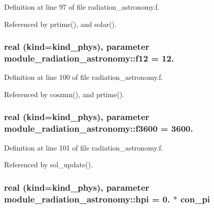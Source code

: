 Definition at line 97 of file radiation\+\_\+astronomy.\+f.



Referenced by prtime(), and solar().

\subsubsection[{\texorpdfstring{f12}{f12}}]{\setlength{\rightskip}{0pt plus 5cm}real (kind=kind\+\_\+phys), parameter module\+\_\+radiation\+\_\+astronomy\+::f12 = 12.\hspace{0.3cm}{\ttfamily [private]}}\hypertarget{group__module__radiation__astronomy_gad59856e8f877eb05a6b22610f14a391d}{}\label{group__module__radiation__astronomy_gad59856e8f877eb05a6b22610f14a391d}


Definition at line 100 of file radiation\+\_\+astronomy.\+f.



Referenced by coszmn(), and prtime().

\subsubsection[{\texorpdfstring{f3600}{f3600}}]{\setlength{\rightskip}{0pt plus 5cm}real (kind=kind\+\_\+phys), parameter module\+\_\+radiation\+\_\+astronomy\+::f3600 = 3600.\hspace{0.3cm}{\ttfamily [private]}}\hypertarget{group__module__radiation__astronomy_ga37b491dde50d06e339effb4a31d9f245}{}\label{group__module__radiation__astronomy_ga37b491dde50d06e339effb4a31d9f245}


Definition at line 101 of file radiation\+\_\+astronomy.\+f.



Referenced by sol\+\_\+update().

\subsubsection[{\texorpdfstring{hpi}{hpi}}]{\setlength{\rightskip}{0pt plus 5cm}real (kind=kind\+\_\+phys), parameter module\+\_\+radiation\+\_\+astronomy\+::hpi = 0. $\ast$ con\+\_\+pi\hspace{0.3cm}{\ttfamily [private]}}\hypertarget{group__module__radiation__astronomy_ga7369d8561566f5e7e51ccc40e09f2520}{}\label{group__module__radiation__astronomy_ga7369d8561566f5e7e51ccc40e09f2520}



